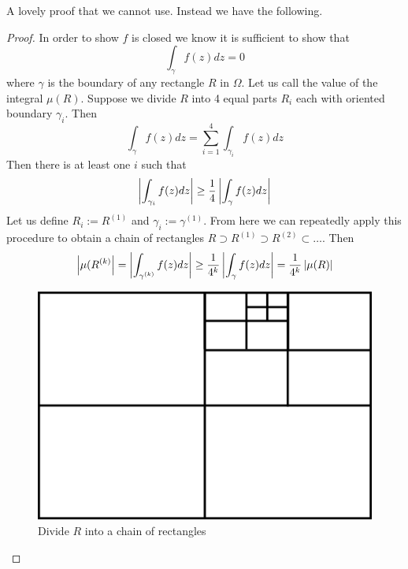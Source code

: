A lovely proof that we cannot use. Instead we have the following.
\begin{proof}
In order to show $f$ is closed we know it is sufficient to show that 
$$ \int_\gamma f(z) dz = 0 $$
where $\gamma$ is the boundary of any rectangle $R$ in $\Omega$. Let us call the value of the integral $\mu(R)$. Suppose we divide $R$ into 4 equal parts $R_i$ each with oriented boundary $\gamma_i$. Then
$$ \int_\gamma f(z) dz = \sum_{i = 1}^4 \int_{\gamma_i} f(z) dz $$
Then there is at least one $i$ such that
$$ \left| \int_{\gamma_i} f(z) dz \right| \geq \frac{1}{4} \left| \int_\gamma f(z) dz \right| $$
Let us define $R_i := R^{(1)}$ and $\gamma_i := \gamma^{(1)}$. From here we can repeatedly apply this procedure to obtain a chain of rectangles $R \supset R^{(1)} \supset R^{(2)} \subset \dots$. Then
\begin{equation}\label{eq:cauchy-thm-ineq-1}
    \left|\mu(R^{(k)}\right| = \left|\int_{\gamma^{(k)}} f(z) dz\right| \geq  \frac{1}{4^k} \left| \int_\gamma f(z) dz \right| = \frac{1}{4^k} \left|\mu(R)\right|
\end{equation}
\begin{figure}[ht]
    \centering
    \includegraphics{Images/cauchy_thm_division.png}
    \caption{Divide $R$ into a chain of rectangles}
    \label{fig:cauchy-thm-div}
\end{figure}


\end{proof}
